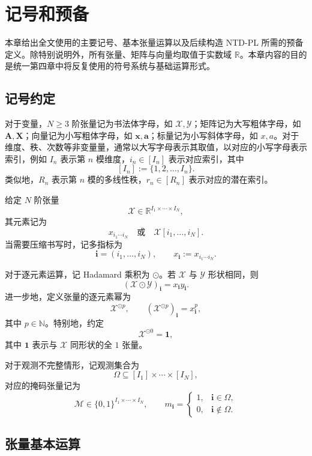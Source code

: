 \section{记号和预备}

本章给出全文使用的主要记号、基本张量运算以及后续构造 NTD-PL 所需的预备定义。除特别说明外，所有张量、矩阵与向量均取值于实数域 $\mathbb{R}$。本章内容的目的是统一第四章中将反复使用的符号系统与基础运算形式。

\subsection{记号约定}

对于变量，$N\ge 3$ 阶张量记为书法体字母，如 $\mathcal{X},\mathcal{Y}$；矩阵记为大写粗体字母，如 $\mathbf{A},\mathbf{X}$；向量记为小写粗体字母，如 $\mathbf{x},\mathbf{a}$；标量记为小写斜体字母，如 $x,a$。对于维度、秩、次数等非变量量，通常以大写字母表示其取值，以对应的小写字母表示索引，例如 $I_n$ 表示第 $n$ 模维度，$i_n\in[I_n]$ 表示对应索引，其中
\[
[I_n] := \{1,2,\dots,I_n\}.
\]
类似地，$R_n$ 表示第 $n$ 模的多线性秩，$r_n\in[R_n]$ 表示对应的潜在索引。

给定 $N$ 阶张量
\[
\mathcal{X}\in\mathbb{R}^{I_1\times\cdots\times I_N},
\]
其元素记为
\[
x_{i_1\cdots i_N}
\quad \text{或} \quad
\mathcal{X}[i_1,\dots,i_N].
\]
当需要压缩书写时，记多指标为
\[
\mathbf{i}=(i_1,\dots,i_N), \qquad x_{\mathbf{i}}:=x_{i_1\cdots i_N}.
\]

对于逐元素运算，记 Hadamard 乘积为 $\odot$。若 $\mathcal{X}$ 与 $\mathcal{Y}$ 形状相同，则
\[
(\mathcal{X}\odot \mathcal{Y})_{\mathbf{i}} = x_{\mathbf{i}} y_{\mathbf{i}}.
\]
进一步地，定义张量的逐元素幂为
\[
\mathcal{X}^{\odot p},
\qquad
(\mathcal{X}^{\odot p})_{\mathbf{i}} = x_{\mathbf{i}}^p,
\]
其中 $p\in\mathbb{N}$。特别地，约定
\[
\mathcal{X}^{\odot 0} = \mathbf{1},
\]
其中 $\mathbf{1}$ 表示与 $\mathcal{X}$ 同形状的全 $1$ 张量。

对于观测不完整情形，记观测集合为
\[
\Omega \subseteq [I_1]\times\cdots\times[I_N],
\]
对应的掩码张量记为
\[
\mathcal{M}\in\{0,1\}^{I_1\times\cdots\times I_N},
\qquad
m_{\mathbf{i}}=
\begin{cases}
1, & \mathbf{i}\in\Omega,\\
0, & \mathbf{i}\notin\Omega.
\end{cases}
\]

\subsection{张量基本运算}

